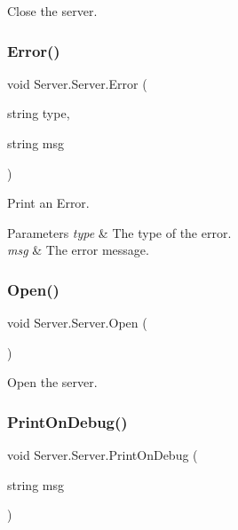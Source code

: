 Close the server. \mbox{\label{class_server_1_1_server_a9e311d0f23134ccc2212c9fe28f15f91}} 
\subsubsection{\texorpdfstring{Error()}{Error()}}
{\footnotesize\ttfamily void Server.\+Server.\+Error (\begin{DoxyParamCaption}\item[{string}]{type,  }\item[{string}]{msg }\end{DoxyParamCaption})\hspace{0.3cm}{\ttfamily [inline]}}

Print an Error. 
\begin{DoxyParams}{Parameters}
{\em type} & The type of the error. \\
\hline
{\em msg} & The error message. \\
\hline
\end{DoxyParams}
\mbox{\label{class_server_1_1_server_a16a01fa77c0292a83902c19e2619eb58}} 
\subsubsection{\texorpdfstring{Open()}{Open()}}
{\footnotesize\ttfamily void Server.\+Server.\+Open (\begin{DoxyParamCaption}{ }\end{DoxyParamCaption})\hspace{0.3cm}{\ttfamily [inline]}}

Open the server. \mbox{\label{class_server_1_1_server_ab7c9f699d19ea455b66a53b0ca78b8d2}} 
\subsubsection{\texorpdfstring{Print\+On\+Debug()}{PrintOnDebug()}}
{\footnotesize\ttfamily void Server.\+Server.\+Print\+On\+Debug (\begin{DoxyParamCaption}\item[{string}]{msg }\end{DoxyParamCaption})\hspace{0.3cm}{\ttfamily [inline]}}

